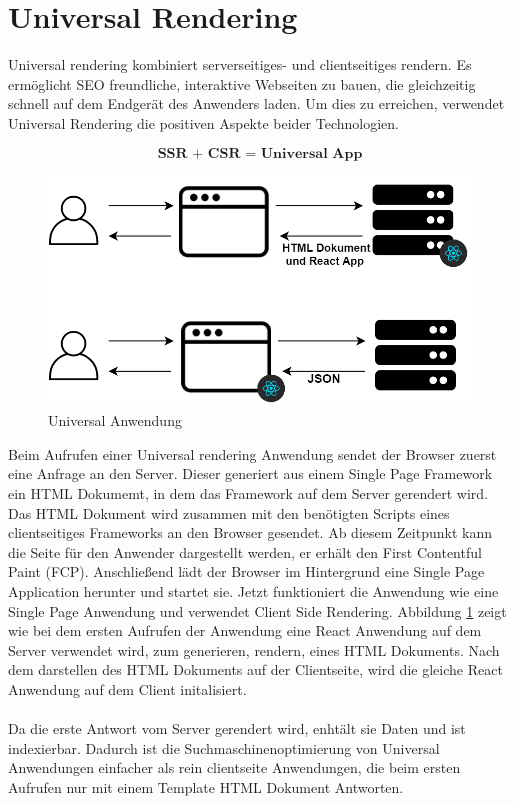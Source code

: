\documentclass[runningheads]{llncs}
\begin{document}
\section{Universal Rendering}
\label{sec:Universal Rendering}
Universal rendering kombiniert serverseitiges- und clientseitiges rendern. 
Es ermöglicht SEO freundliche, interaktive Webseiten zu bauen, 
die gleichzeitig schnell auf dem Endgerät des Anwenders laden. 
Um dies zu erreichen, 
verwendet Universal Rendering die positiven Aspekte beider Technologien.

\begin{equation*}
  \textbf{SSR + CSR = Universal App}
\end{equation*}
\begin{figure}[h]
  \centering
  \includegraphics[width=12cm]{images/react}
  \caption{Universal Anwendung}
  \label{Universal Anwendung}
\end{figure}

Beim Aufrufen einer Universal rendering Anwendung sendet der Browser
zuerst eine Anfrage an den Server. 
Dieser generiert aus einem Single Page Framework ein HTML Dokumemt,
in dem das Framework auf dem Server gerendert wird. 
Das HTML Dokument wird zusammen mit den benötigten Scripts eines clientseitiges Frameworks
an den Browser gesendet.
Ab diesem Zeitpunkt kann die Seite für den Anwender dargestellt werden, 
er erhält den First Contentful Paint (FCP). 
Anschließend lädt der Browser im Hintergrund eine Single Page Application herunter
und startet sie. 
Jetzt funktioniert die Anwendung wie eine Single Page Anwendung und 
verwendet Client Side Rendering. Abbildung \ref{Universal Anwendung} zeigt wie bei dem 
ersten Aufrufen der Anwendung eine React Anwendung auf dem Server verwendet wird,
zum generieren, rendern, eines HTML Dokuments. 
Nach dem darstellen des HTML Dokuments auf der Clientseite, 
wird die gleiche React Anwendung auf dem Client initalisiert.
\\
\\
Da die erste Antwort vom Server gerendert wird, enhtält sie Daten und ist
indexierbar. Dadurch ist die Suchmaschinenoptimierung von Universal Anwendungen einfacher
als rein clientseite Anwendungen, die beim ersten Aufrufen nur mit einem Template
HTML Dokument Antworten.
\end{document}
